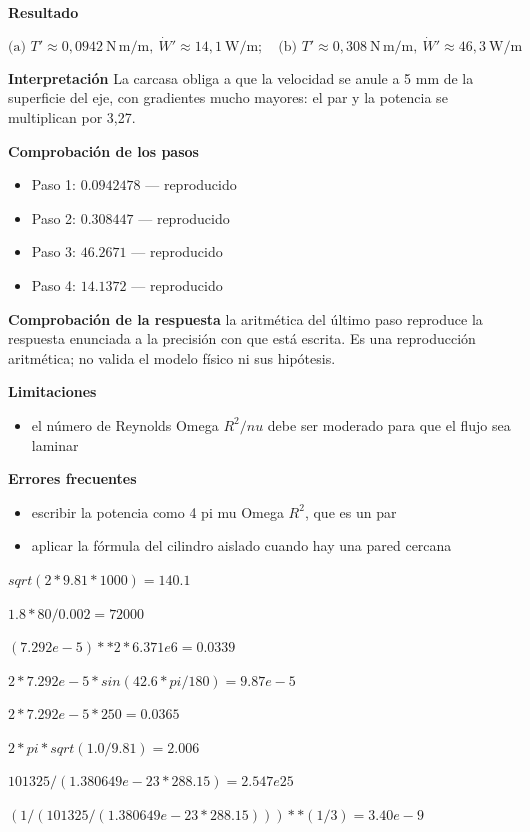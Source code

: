 \documentclass[10pt,openany]{book}
\begin{document}
\noindent\textbf{Resultado}

\[
\text{(a) } T' \approx 0{,}0942\ \mathrm{N\,m/m},\ \dot W' \approx 14{,}1\ \mathrm{W/m};\quad \text{(b) } T' \approx 0{,}308\ \mathrm{N\,m/m},\ \dot W' \approx 46{,}3\ \mathrm{W/m}
\]

\noindent\textbf{Interpretación}
La carcasa obliga a que la velocidad se anule a 5 mm de la superficie del eje, con gradientes mucho mayores: el par y la potencia se multiplican por 3,27.

\noindent\textbf{Comprobación de los pasos}
\begin{itemize}
\item Paso 1: $0.0942478$ — reproducido
\item Paso 2: $0.308447$ — reproducido
\item Paso 3: $46.2671$ — reproducido
\item Paso 4: $14.1372$ — reproducido
\end{itemize}

\noindent\textbf{Comprobación de la respuesta} la aritmética del último paso reproduce la respuesta enunciada a la precisión con que está escrita. Es una reproducción aritmética; no valida el modelo físico ni sus hipótesis.

\noindent\textbf{Limitaciones}
\begin{itemize}
\item el número de Reynolds Omega \(R^2/nu\) debe ser moderado para que el flujo sea laminar
\end{itemize}

\noindent\textbf{Errores frecuentes}
\begin{itemize}
\item escribir la potencia como 4 pi mu Omega \(R^2\), que es un par
\item aplicar la fórmula del cilindro aislado cuando hay una pared cercana
\end{itemize}

\(sqrt(2*9.81*1000) = 140.1\)

\(1.8*80/0.002 = 72000\)

\((7.292e-5)**2*6.371e6 = 0.0339\)

\(2*7.292e-5*sin(42.6*pi/180) = 9.87e-5\)

\(2*7.292e-5*250 = 0.0365\)

\(2*pi*sqrt(1.0/9.81) = 2.006\)

\(101325/(1.380649e-23*288.15) = 2.547e25\)

\((1/(101325/(1.380649e-23*288.15)))**(1/3) = 3.40e-9\)
\end{document}
